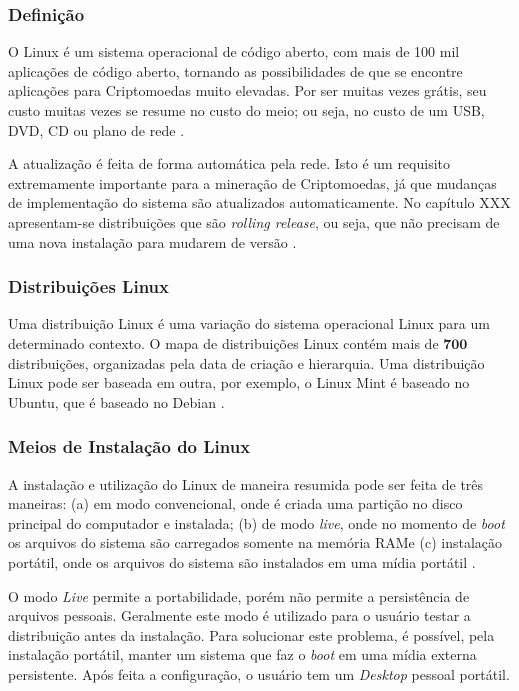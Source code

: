 \documentclass[
article,			%
12pt,				%
openright,			%
oneside,			%
a4paper,			%
chapter=TITLE,		%
section=TITLE,		%
subsection=TITLE,	%
subsubsection=TITLE,%
subsubsubsection=TITLE, %
english,			%
brazil,				%
]{abntex2}
\begin{document}
\subsubsection{Definição}

O Linux é um sistema operacional de código aberto, com mais de 100 mil
aplicações de código aberto, tornando as possibilidades de que se
encontre aplicações para Criptomoedas muito elevadas. Por ser muitas
vezes grátis, seu custo muitas vezes se resume no custo do meio; ou
seja, no custo de um USB, DVD, CD ou plano de rede \cite{Nunes2009}.

A atualização é feita de forma automática pela rede. Isto é um
requisito extremamente importante para a mineração de Criptomoedas, já
que mudanças de implementação do sistema são atualizados
automaticamente. No capítulo XXX apresentam-se distribuições que são
\emph{rolling release}, ou seja, que não precisam de uma nova
instalação para mudarem de versão \cite{Nunes2009, ArchWiki2018a}.

\subsubsection{Distribuições Linux}\label{cap:distribuicoes-linux}

Uma distribuição Linux é uma variação do sistema operacional Linux
para um determinado contexto. O mapa de distribuições Linux contém
mais de $\mathbf{700}$ distribuições, organizadas pela data de criação
e hierarquia. Uma distribuição Linux pode ser baseada em outra, por
exemplo, o Linux Mint é baseado no Ubuntu, que é baseado no Debian
\cite{Loli2017}.


\subsubsection{Meios de Instalação do Linux}

A instalação e utilização do Linux de maneira resumida pode ser feita
de três maneiras: (a) em modo convencional, onde é criada uma partição
no disco principal do computador e instalada; (b) de modo \emph{live},
onde no momento de \emph{boot} os arquivos do sistema são carregados
somente na memória RAM\@ e (c) instalação portátil, onde os arquivos
do sistema são instalados em uma mídia portátil \cite{Nunes2009}.

O modo \emph{Live} permite a portabilidade, porém não permite a
persistência de arquivos pessoais. Geralmente este modo é utilizado
para o usuário testar a distribuição antes da instalação. Para
solucionar este problema, é possível, pela instalação portátil, manter
um sistema que faz o \emph{boot} em uma mídia externa persistente.
Após feita a configuração, o usuário tem um \emph{Desktop} pessoal
portátil.
\end{document}
